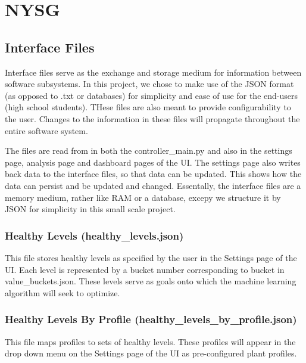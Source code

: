 \documentclass[
]{article}
\author{}
\date{}
\begin{document}
\hypertarget{nysg}{%
\section{NYSG}\label{nysg}}

\hypertarget{interface-files}{%
\subsection{Interface Files}\label{interface-files}}

Interface files serve as the exchange and storage medium for information
between software subsystems. In this project, we chose to make use of
the JSON format (as opposed to .txt or databases) for simplicity and
ease of use for the end-users (high school students). THese files are
also meant to provide configurability to the user. Changes to the
information in these files will propagate throughout the entire software
system.

The files are read from in both the controller\_main.py and also in the
settings page, analysis page and dashboard pages of the UI. The settings
page also writes back data to the interface files, so that data can be
updated. This shows how the data can persist and be updated and changed.
Essentally, the interface files are a memory medium, rather like RAM or
a database, excepy we structure it by JSON for simplicity in this small
scale project.

\hypertarget{healthy-levels-healthy_levels.json}{%
\subsubsection{Healthy Levels
(healthy\_levels.json)}\label{healthy-levels-healthy_levels.json}}

This file stores healthy levels as specified by the user in the Settings
page of the UI. Each level is represented by a bucket number
corresponding to bucket in value\_buckets.json. These levels serve as
goals onto which the machine learning algorithm will seek to optimize.

\hypertarget{healthy-levels-by-profile-healthy_levels_by_profile.json}{%
\subsubsection{Healthy Levels By Profile
(healthy\_levels\_by\_profile.json)}\label{healthy-levels-by-profile-healthy_levels_by_profile.json}}

This file maps profiles to sets of healthy levels. These profiles will
appear in the drop down menu on the Settings page of the UI as
pre-configured plant profiles.
\end{document}
